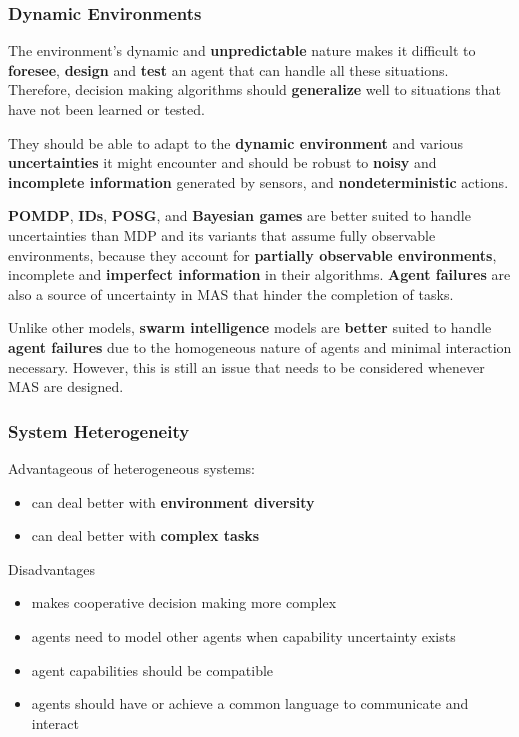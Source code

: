 \documentclass{article}
\begin{document}
				\subsubsection{Dynamic Environments}
				The environment's dynamic and \textbf{unpredictable} nature makes it difficult to \textbf{foresee}, \textbf{design} and \textbf{test} an agent that can handle all these situations. Therefore, decision making algorithms should \textbf{generalize} well to situations that have not been learned or tested. 
				
				They should be able to adapt to the \textbf{dynamic environment} and various \textbf{uncertainties} it might encounter and should be robust to \textbf{noisy} and \textbf{incomplete information} generated by sensors, and \textbf{nondeterministic} actions. 
				
				\textbf{POMDP}, \textbf{IDs}, \textbf{POSG}, and \textbf{Bayesian games} are better suited to handle uncertainties than MDP and its variants that assume fully observable environments, because they account for \textbf{partially observable environments}, incomplete and \textbf{imperfect information} in their  algorithms. \textbf{Agent failures} are also a source of uncertainty in MAS that hinder the completion of tasks. 
				
				Unlike other models, \textbf{swarm intelligence} models are \textbf{better} suited to handle \textbf{agent failures} due to the homogeneous nature of agents and minimal interaction necessary. However, this is still an issue that needs to be considered whenever MAS are designed.
				
				\subsubsection{System Heterogeneity}
				Advantageous of heterogeneous systems:
				\begin{itemize}
					\item can deal better with \textbf{environment diversity}
					\item can deal better with \textbf{complex tasks}
				\end{itemize}
				
				Disadvantages
				\begin{itemize}
					\item makes cooperative decision making more complex
					\item agents need to model other agents when capability uncertainty exists
					\item agent capabilities should be compatible
					\item agents should have or achieve a common language to communicate and interact
				\end{itemize}
				
\end{document}
